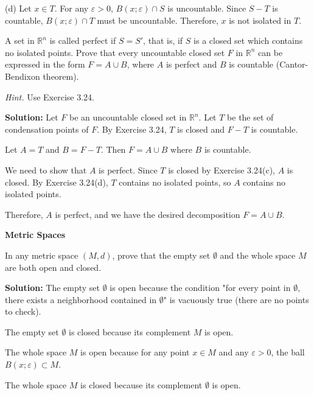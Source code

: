 (d) Let $x \in T$. For any $\varepsilon > 0$, $B(x;\varepsilon) \cap S$ is uncountable. Since $S - T$ is countable, $B(x;\varepsilon) \cap T$ must be uncountable. Therefore, $x$ is not isolated in $T$.

\begin{problembox}
A set in \( \mathbb{R}^n \) is called perfect if \( S = S' \), that is, if \( S \) is a closed set which contains no isolated points. Prove that every uncountable closed set \( F \) in \( \mathbb{R}^n \) can be expressed in the form \( F = A \cup B \), where \( A \) is perfect and \( B \) is countable (Cantor-Bendixon theorem).

\textit{Hint.} Use Exercise 3.24.
\end{problembox}

\textbf{Solution:} Let $F$ be an uncountable closed set in $\mathbb{R}^n$. Let $T$ be the set of condensation points of $F$. By Exercise 3.24, $T$ is closed and $F - T$ is countable.

Let $A = T$ and $B = F - T$. Then $F = A \cup B$ where $B$ is countable.

We need to show that $A$ is perfect. Since $T$ is closed by Exercise 3.24(c), $A$ is closed. By Exercise 3.24(d), $T$ contains no isolated points, so $A$ contains no isolated points.

Therefore, $A$ is perfect, and we have the desired decomposition $F = A \cup B$.

\textbf{Metric Spaces}

\begin{problembox}
In any metric space \((M, d)\), prove that the empty set \( \emptyset \) and the whole space \( M \) are both open and closed.
\end{problembox}

\textbf{Solution:} The empty set $\emptyset$ is open because the condition "for every point in $\emptyset$, there exists a neighborhood contained in $\emptyset$" is vacuously true (there are no points to check).

The empty set $\emptyset$ is closed because its complement $M$ is open.

The whole space $M$ is open because for any point $x \in M$ and any $\varepsilon > 0$, the ball $B(x;\varepsilon) \subset M$.

The whole space $M$ is closed because its complement $\emptyset$ is open.

